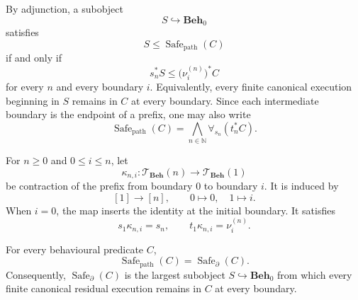 By adjunction, a subobject
\[
    S\hookrightarrow\mathbf{Beh}_0
\]
satisfies
\[
    S\leq\operatorname{Safe}_{\mathrm{path}}(C)
\]
if and only if
\[
    s_n^\ast S
    \leq
    \bigl(\nu_i^{(n)}\bigr)^\ast C
\]
for every \(n\) and every boundary \(i\). Equivalently, every finite
canonical execution beginning in \(S\) remains in \(C\) at every boundary.
Since each intermediate boundary is the endpoint of a prefix, one may also
write
\[
    \operatorname{Safe}_{\mathrm{path}}(C)
    =
    \bigwedge_{n\in\mathbb N}
    \forall_{s_n}(t_n^\ast C).
\]

For \(n\geq0\) and \(0\leq i\leq n\), let
\[
    \kappa_{n,i}:
    \mathscr T_{\mathbf{Beh}}(n)
    \to
    \mathscr T_{\mathbf{Beh}}(1)
\]
be contraction of the prefix from boundary \(0\) to boundary \(i\). It is
induced by
\[
    [1]\to[n],
    \qquad
    0\mapsto0,
    \quad
    1\mapsto i.
\]
When \(i=0\), the map inserts the identity at the initial boundary. It
satisfies
\[
    s_1\kappa_{n,i}=s_n,
    \qquad
    t_1\kappa_{n,i}=\nu_i^{(n)}.
\]

\begin{theorem}
\label{thm:safety-core-universal-temporal-safety}
For every behavioural predicate \(C\),
\[
    \operatorname{Safe}_{\mathrm{path}}(C)
    =
    \operatorname{Safe}_{\partial}(C).
\]
Consequently, \(\operatorname{Safe}_{\partial}(C)\) is the largest subobject
\(S\hookrightarrow\mathbf{Beh}_0\) from which every finite canonical
residual execution remains in \(C\) at every boundary.
\end{theorem}

